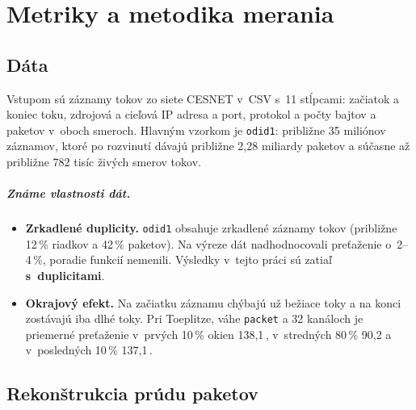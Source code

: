 \chapter{Metriky a metodika merania}
\label{chap:metodika}

\section{Dáta}
\label{sec:data}

Vstupom sú záznamy tokov zo siete CESNET v~CSV s~11 stĺpcami: začiatok a koniec toku,
zdrojová a cieľová IP adresa a port, protokol a počty bajtov a paketov v~oboch smeroch.
Hlavným vzorkom je \texttt{odid1}: približne 35 miliónov záznamov, ktoré po rozvinutí
dávajú približne 2,28 miliardy paketov a súčasne až približne 782 tisíc živých smerov tokov.


\paragraph{Známe vlastnosti dát.}
\begin{itemize}
  \item \textbf{Zrkadlené duplicity.} \texttt{odid1} obsahuje zrkadlené záznamy tokov
        (približne 12\,\% riadkov a 42\,\% paketov). Na výreze dát nadhodnocovali preťaženie
        o~2--4\,\%, poradie funkcií nemenili. Výsledky v~tejto práci sú zatiaľ
        \textbf{s~duplicitami}. 
  \item \textbf{Okrajový efekt.} Na začiatku záznamu chýbajú už bežiace toky a na konci
        zostávajú iba dlhé toky. Pri Toeplitze, váhe \texttt{packet} a 32 kanáloch je priemerné
        preťaženie v~prvých 10\,\% okien 138,1\,\textperthousand, v~stredných 80\,\% 90,2
        a v~posledných 10\,\% 137,1\,\textperthousand.
\end{itemize}

\section{Rekonštrukcia prúdu paketov}
\label{sec:rekonstrukcia}


